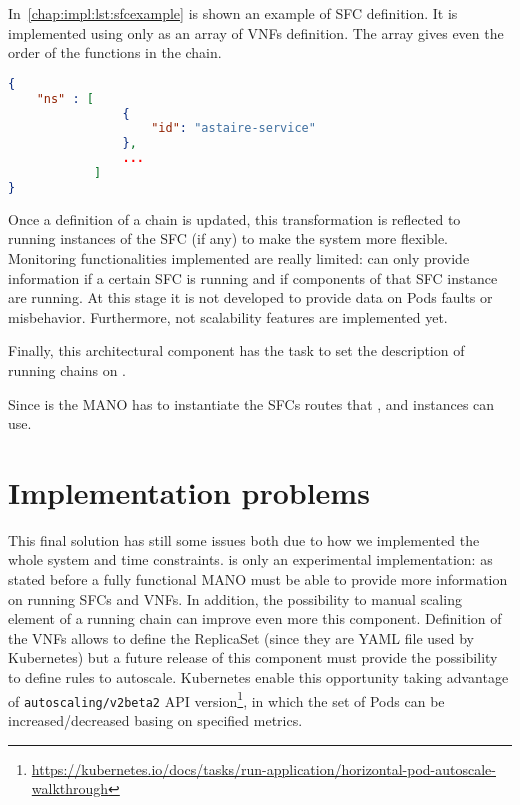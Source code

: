 In~\ref{chap:impl:lst:sfcexample} is shown an example of SFC definition. It is
implemented using only as an array of VNFs definition. The array gives even the
order of the functions in the chain.
\begin{lstlisting}[caption={Example of SFC definition}, captionpos=b,
                   language=json, label=chap:impl:lst:sfcexample]
{
    "ns" : [
                {
                    "id": "astaire-service"
                },
                ...
            ]
}
\end{lstlisting}

Once a definition of a chain is updated, this transformation is reflected to
running instances of the SFC (if any) to make the system more flexible.
Monitoring functionalities implemented are really limited: \harbor{} can only
provide information if a certain SFC is running and if components of that SFC
instance are running. At this stage it is not developed to provide data on Pods
faults or misbehavior. Furthermore, not scalability features are implemented
yet.

Finally, this architectural component has the task to set the description of
running chains on \roulette{}.

Since \harbor{} is the MANO has to instantiate the SFCs routes that 
\ingresses{}, \egresses{} and \astaire{} instances can use. 

\section{Implementation problems} \label{chap:impl:sec:problems}
This final solution has still some issues both due to how we implemented the
whole system and time constraints. \harbor{} is only an experimental
implementation: as stated before a fully functional MANO must be able to provide
more information on running SFCs and VNFs. In addition, the possibility to
manual scaling element of a running chain can improve even more this component.
Definition of the VNFs allows to define the ReplicaSet (since they are YAML
file used by Kubernetes) but a future release of this component must provide
the possibility to define rules to autoscale. Kubernetes enable this
opportunity taking advantage of \texttt{autoscaling/v2beta2} API
version\footnote{\sloppy\url{https://kubernetes.io/docs/tasks/run-application/horizontal-pod-autoscale-walkthrough}},
in which the set of Pods can be increased/decreased basing on specified metrics.

